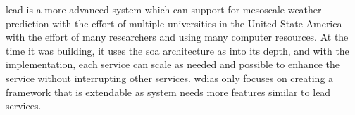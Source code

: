 \acrshort{lead} is a more advanced system which can support for mesoscale weather prediction with the effort of multiple universities in the United State America with the effort of many researchers and using many computer resources. At the time it was building, it uses the \acrshort{soa} architecture as into its depth, and with the implementation, each service can scale as needed and possible to enhance the service without interrupting other services. \acrshort{wdias} only focuses on creating a framework that is extendable as system needs more features similar to \acrshort{lead} services.
